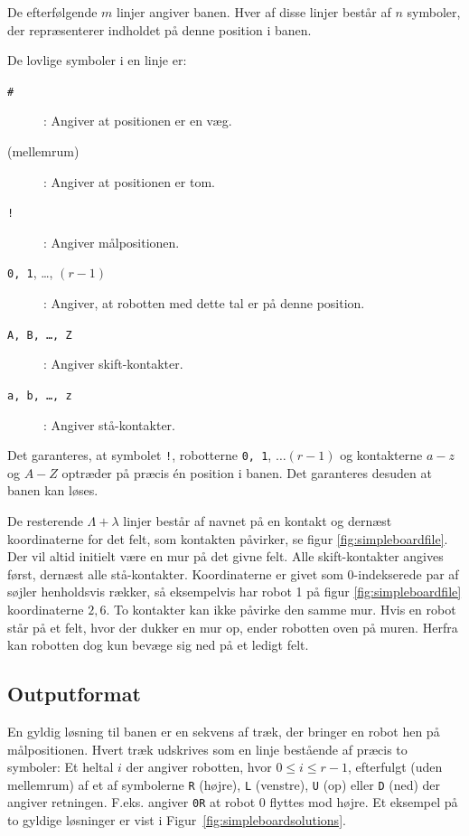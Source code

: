 \documentclass[10pt, a4paper]{article}
\begin{document}
De efterfølgende $m$ linjer angiver banen.
Hver af disse linjer består af $n$ symboler, der repræsenterer indholdet på denne position i banen.

De lovlige symboler i en linje er:

\begin{description}
\item[\texttt{\#}]: Angiver at positionen er en væg.
\item[(mellemrum)]: Angiver at positionen er tom.
\item[\texttt{!}]: Angiver målpositionen.
\item[\texttt{0, 1}, \ldots, $(r-1)$]: Angiver, at robotten med dette tal er på denne position.
\item[\texttt{A, B, \ldots, Z}]: Angiver skift-kontakter.
\item[\texttt{a, b, \ldots, z}]: Angiver stå-kontakter.
\end{description}

Det garanteres, at symbolet \texttt{!}, robotterne \texttt{0, 1}, $\ldots (r-1)$ og kontakterne $a-z$ og $A-Z$ optræder på præcis én position i banen.
Det garanteres desuden at banen kan løses.

De resterende $\Lambda+\lambda$ linjer består af navnet på en kontakt og dernæst koordinaterne for det felt, som kontakten påvirker, se figur \ref{fig:simpleboardfile}.
Der vil altid initielt være en mur på det givne felt.
Alle skift-kontakter angives først, dernæst alle stå-kontakter.
Koordinaterne er givet som 0-indekserede par af søjler henholdsvis rækker, så eksempelvis har robot 1 på figur \ref{fig:simpleboardfile} koordinaterne $2, 6$.
To kontakter kan ikke påvirke den samme mur.
Hvis en robot står på et felt, hvor der dukker en mur op, ender robotten oven på muren.
Herfra kan robotten dog kun bevæge sig ned på et ledigt felt.

\subsection{Outputformat}
En gyldig løsning til banen er en sekvens af træk, der bringer en robot hen på målpositionen.
Hvert træk udskrives som en linje bestående af præcis to symboler: Et heltal $i$ der angiver robotten, hvor $0 \leq i \leq r-1$, efterfulgt (uden mellemrum) af et af symbolerne \texttt{R} (højre), \texttt{L} (venstre), \texttt{U} (op) eller \texttt{D} (ned) der angiver retningen.
F.eks. angiver \texttt{0R} at robot 0 flyttes mod højre. Et eksempel på to gyldige løsninger er vist i Figur~\ref{fig:simpleboardsolutions}.
\end{document}
